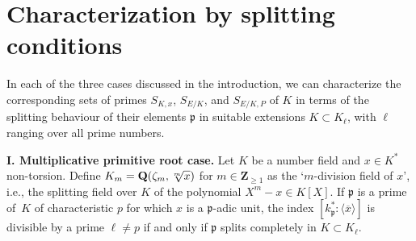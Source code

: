 \documentclass{amsart}
\theoremstyle{plain}
\theoremstyle{definition}
\newcommand{\Que}{{\mathbf{Q}}}
\newcommand{\Zee}{{\mathbf{Z}}}
\newcommand{\gothp}{{\mathfrak{p}}}
\begin{document}
\vfil\eject
\section{Characterization by splitting conditions}
\label{S:splittingconditions}

\noindent
In each of the three cases discussed in the introduction, 
we can characterize the corresponding sets of primes
$S_{K, x}$, $S_{E/K}$, and $S_{E/K, P}$ of $K$
in terms of the splitting behaviour of their elements $\gothp$ 
in suitable extensions $K\subset K_\ell$, with $\ell$ ranging over all prime numbers.

\medskip\noindent
{\bf I. Multiplicative primitive root case.}
Let $K$ be a number field 
and $x\in K^*$ non-torsion.
Define $K_m=\Que(\zeta_m,\root m \of x)$ for $m\in\Zee_{\ge1}$
as the `$m$-division field of $x$', i.e., the splitting field over $K$ of the polynomial $X^m-x\in K[X]$.
If $\gothp$ is a prime of~$K$ of characteristic $p$ for which $x$ is 
a $\gothp$-adic unit, 
the index $[k_\gothp^*:\langle \overline x\rangle]$
is divisible by a prime $\ell\ne p$ if and only if $\gothp$ 
splits completely in $K\subset K_\ell$.
\end{document}
